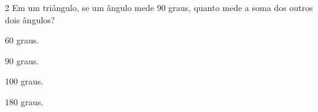 

\num{2}  Em um triângulo, se um ângulo mede $90$ graus, quanto mede a soma dos
outros dois ângulos?

\begin{escolha}
\item $60$ graus.
\item $90$ graus.
\item $100$ graus.
\item $180$ graus.
\end{escolha}



